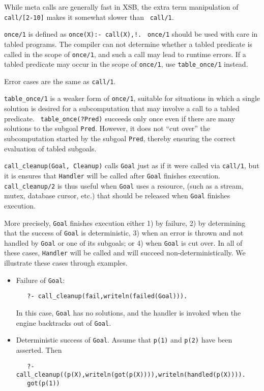 \begin{description}
While meta calls are generally fast in XSB, the extra term
manipulation of {\tt call/[2-10]} makes it somewhat slower than {\tt
  call/1}.

%
    {\tt once/1} is defined as {\tt once(X):- call(X),!.}  {\tt
    once/1} should be used with care in tabled programs.  The compiler
    can not determine whether a tabled predicate is called in the
    scope of {\tt once/1}, and such a call may lead to runtime errors.
    If a tabled predicate may occur in the scope of {\tt once/1}, use
    {\tt table\_once/1} instead.

    Error cases are the same as {\tt call/1}.

    {\tt table\_once/1} is a weaker form of {\tt once/1}, suitable for
    situations in which a single solution is desired for a
    subcomputation that may involve a call to a tabled predicate.  {\tt
    table\_once(?Pred)} succeeds only once even if there are many
    solutions to the subgoal {\tt Pred}.  However, it does not ``cut
    over'' the subcomputation started by the subgoal {\tt Pred},
    thereby ensuring the correct evaluation of tabled subgoals.

%
{\tt call\_cleanup(Goal, Cleanup)} calls {\tt Goal} just as if it were
called via {\tt call/1}, but it is ensures that {\tt Handler} will be
called after {\tt Goal} finishes execution.  {\tt call\_cleanup/2} is
thus useful when {\tt Goal} uses a resource, (such as a stream, mutex,
database cursor, etc.) that should be released when {\tt Goal}
finishes execution.

More precisely, {\tt Goal} finishes execution either 1) by failure, 2)
by determining that the success of {\tt Goal} is deterministic, 3)
when an error is thrown and not handled by {\tt Goal} or one of its
subgoals; or 4) when {\tt Goal} is cut over.  In all of these cases,
{\tt Handler} will be called and will succeed non-deterministically.
We illustrate these cases through examples.
\begin{itemize}
\item Failure of {\tt Goal}:
\begin{verbatim}
   ?- call_cleanup(fail,writeln(failed(Goal))).
\end{verbatim}
In this case, {\tt Goal} has no solutions, and the handler is invoked
when the engine backtracks out of {\tt Goal}.
%
\item Deterministic success of {\tt Goal}.  Assume that {\tt p(1)} and
  {\tt p(2)} have been asserted.  Then
\begin{verbatim}
   ?- call_cleanup((p(X),writeln(got(p(X)))),writeln(handled(p(X)))).
   got(p(1))


\end{verbatim}
\end{itemize}
\end{description}
